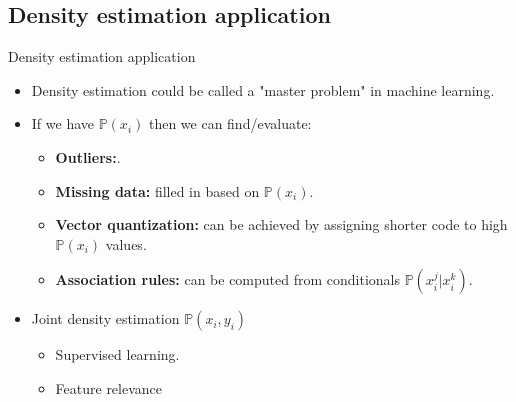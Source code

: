 \documentclass[11pt,aspectratio=1610,usenames,dvipsnames]{beamer} %
\begin{document}
\subsection{Density estimation application}%
\begin{frame}{Density estimation application}
	\begin{itemize}
		\item Density estimation could be called a "master problem" in machine learning.
		\item If we have $ \mathbb{P}(x_{i}) $ then we can find/evaluate:
	\begin{itemize}
		\item \textbf{\textcolor{monkgreen}{Outliers:}}.
		\item \textbf{\textcolor{monkgreen}{Missing data:}} filled in based on  $\mathbb{P}(x_{i}) $.
		\item \textbf{\textcolor{monkgreen}{Vector quantization:}} can be achieved by assigning shorter code to high $ \mathbb{P}(x_{i}) $ values.
		\item \textbf{\textcolor{monkgreen}{Association rules:}} can be computed from conditionals  $\mathbb{P}(x_{i}^{j}|x_{i}^{k}) $.
	\end{itemize}
		\item Joint density estimation $\mathbb{P}(x_{i}, y_{i})$
	\begin{itemize}
		\item Supervised learning.
		\item Feature relevance
	\end{itemize}
	\end{itemize}
\end{frame}
\end{document}

